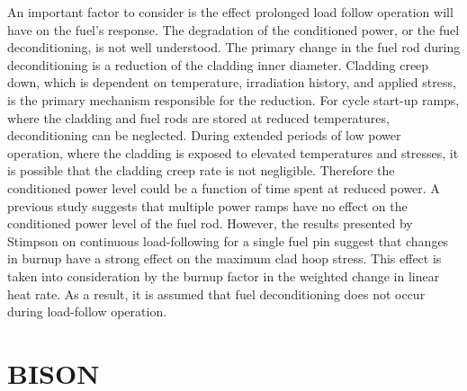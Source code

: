 \documentclass[edeposit,fullpage,11pt]{uiucthesis2009}
\begin{document}
An important factor to consider is the effect prolonged load follow operation will have on the fuel's response.
The degradation of the conditioned power, or the fuel deconditioning, is not well understood.
The primary change in the fuel rod during deconditioning is a reduction of the cladding inner diameter.
Cladding creep down, which is dependent on temperature, irradiation history, and applied stress, is the primary mechanism responsible for the reduction.  
For cycle start-up ramps, where the cladding and fuel rods are stored at reduced temperatures, deconditioning can be neglected. %
During extended periods of low power operation, where the cladding is exposed to elevated temperatures and stresses, it is possible that the cladding creep rate is not negligible.
Therefore the conditioned power level could be a function of time spent at reduced power.
A previous study \cite{galrtner_survey_1987} suggests that multiple power ramps have no effect on the conditioned power level of the fuel rod.  
However, the results presented by Stimpson \cite{stimpson_demonstration_2017} on continuous load-following for a single fuel pin suggest that changes in burnup have a strong effect on the maximum clad hoop stress.
This effect is taken into consideration by the burnup factor in the weighted change in linear heat rate.
As a result, it is assumed that fuel deconditioning does not occur during load-follow operation.


\section{BISON}
\end{document}
